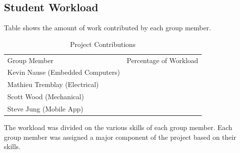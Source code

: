 \documentclass{article}
\begin{document}
\subsection{Student Workload}
Table shows the amount of work contributed by each group member.
\begin{table}[H]
\centering
\caption{Project Contributions}
\label{workload-percentage}
\begin{tabular}{ll}
Group Member     				  & Percentage of Workload \\
Kevin Nause (Embedded Computers)    &                        \\
Mathieu Tremblay (Electrical)		  &                        \\
Scott Wood     (Mechanical)		  &                        \\
Steve Jung     (Mobile App)  		  &                       
\end{tabular}
\end{table}

The workload was divided on the various skills of each group member. Each group member was assigned a major component of the project based on their skills. 

\pagebreak

\printglossary[type=acronym]
\printglossary[type=beer]
\printglossary[type=technical]

\pagebreak

{}


\pagebreak
\end{document}
